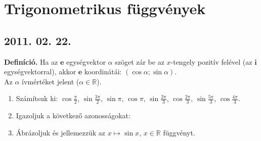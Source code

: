 \section{Trigonometrikus függvények}

\subsection*{2011. 02. 22.}
\textbf{Definíció.} Ha az $\mathbf{e}$ egységvektor $\alpha$ szöget zár be az $x$-tengely pozitív felével (az $\mathbf{i}$ egységvektorral), akkor $\mathbf{e}$ koordinátái: $(\cos\alpha;\sin\alpha)$.\\
Az $\alpha$ ívmértéket jelent ($\alpha\in\mathbb R$).

\begin{enumerate}
\item Számítsuk ki: $\cos\frac{\pi}{2}$, $\sin\frac{3\pi}{2}$, $\sin\pi$, $\cos\pi$, $\sin\frac{2\pi}{3}$, $\cos\frac{2\pi}{3}$, $\sin\frac{5\pi}{3}$, $\cos\frac{4\pi}{3}$.
\item Igazoljuk a következő azonosságokat:
\item Ábrázoljuk és jellemezzük az $x\mapsto \sin x$, $x\in \mathbb R$ függvényt.
\end{enumerate}

